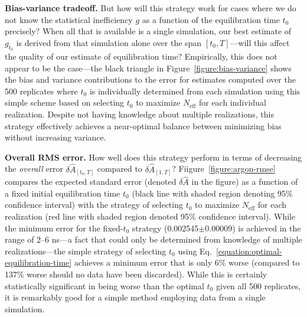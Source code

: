 \documentclass[aps,pre,twocolumn,nofootinbib,superscriptaddress,linenumbers,11point]{revtex4-1}
\begin{document}
{\bf Bias-variance tradeoff.} 
But how will this strategy work for cases where we do not know the statistical inefficiency $g$ as a function of the equilibration time $t_0$ precisely?
When all that is available is a single simulation, our best estimate of $g_{t_0}$ is derived from that simulation alone over the span $[t_0,T]$---will this affect the quality of our estimate of equilibration time?
Empirically, this does not appear to be the case---the black triangle in Figure~\ref{figure:bias-variance} shows the bias and variance contributions to the error for estimates computed over the 500 replicates where $t_0$ is individually determined from each simulation using this simple scheme based on selecting $t_0$ to maximize $N_\mathrm{eff}$ for each individual realization.
Despite not having knowledge about multiple realizations, this strategy effectively achieves a near-optimal balance between minimizing bias without increasing variance.

{\bf Overall RMS error.} 
How well does this strategy perform in terms of decreasing the \emph{overall} error $\delta \hat{A}_{[t_0,T]}$ compared to $\delta \hat{A}_{[1,T]}$?
Fiigure~\ref{figure:argon-rmse} compares the expected standard error (denoted $\delta \hat{A}$ in the figure) as a function of a fixed initial equilibration time $t_0$ (black line with shaded region denoting 95\% confidence interval) with the strategy of selecting $t_0$ to maximize $N_\mathrm{eff}$ for each realization (red line with shaded region denoted 95\% confidence interval).
While the minimum error for the fixed-$t_0$ strategy (0.002545$\pm$0.00009) is achieved in the range of 2--6 ns---a fact that could only be determined from knowledge of multiple realizations---the simple strategy of selecting $t_0$ using Eq.~\ref{equation:optimal-equilibration-time} achieves a minimum error that is only 6\% worse (compared to 137\% worse should no data have been discarded).
While this is certainly statistically significant in being worse than the optimal $t_0$ given all 500 replicates, it is remarkably good for a simple method employing data from a single simulation.

\end{document}
